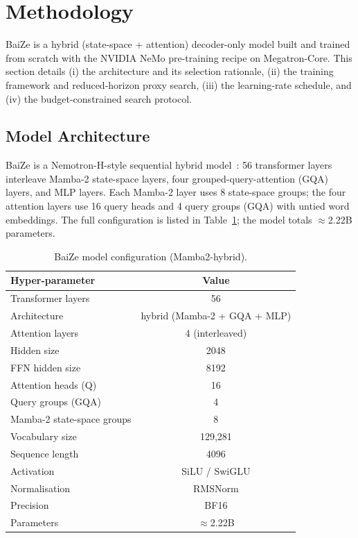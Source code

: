 \section{Methodology}\label{sec:method}

BaiZe is a hybrid (state-space + attention) decoder-only model built and trained from scratch with the NVIDIA NeMo pre-training recipe on Megatron-Core.
This section details (i) the architecture and its selection rationale, (ii) the training framework and reduced-horizon proxy search, (iii) the learning-rate schedule, and (iv) the budget-constrained search protocol.

\subsection{Model Architecture}\label{sec:arch}
BaiZe is a Nemotron-H-style sequential hybrid model~\cite{dao2024transformers,nvidia2025nemotronh}: 56 transformer layers interleave Mamba-2 state-space layers, four grouped-query-attention (GQA) layers, and MLP layers.
Each Mamba-2 layer uses 8 state-space groups; the four attention layers use 16 query heads and 4 query groups (GQA) with untied word embeddings.
The full configuration is listed in Table~\ref{tab:config}; the model totals $\approx$2.22B parameters.

\begin{table}[htbp]
\centering
\caption{BaiZe model configuration (Mamba2-hybrid).}
\label{tab:config}
\begin{tabular}{lc}
\toprule
\textbf{Hyper-parameter} & \textbf{Value} \\
\midrule
Transformer layers & 56 \\
Architecture & hybrid (Mamba-2 + GQA + MLP) \\
Attention layers & 4 (interleaved) \\
Hidden size & 2048 \\
FFN hidden size & 8192 \\
Attention heads (Q) & 16 \\
Query groups (GQA) & 4 \\
Mamba-2 state-space groups & 8 \\
Vocabulary size & 129{,}281 \\
Sequence length & 4096 \\
Activation & SiLU / SwiGLU \\
Normalisation & RMSNorm \\
Precision & BF16 \\
Parameters & $\approx$2.22B \\
\bottomrule
\end{tabular}
\end{table}

